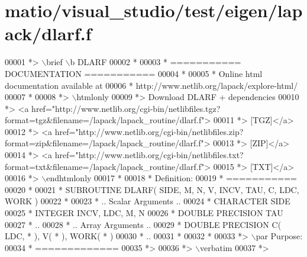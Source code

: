 \hypertarget{matio_2visual__studio_2test_2eigen_2lapack_2dlarf_8f_source}{}\section{matio/visual\+\_\+studio/test/eigen/lapack/dlarf.f}
\label{matio_2visual__studio_2test_2eigen_2lapack_2dlarf_8f_source}

\begin{DoxyCode}
00001 \textcolor{comment}{*> \(\backslash\)brief \(\backslash\)b DLARF}
00002 \textcolor{comment}{*}
00003 \textcolor{comment}{*  =========== DOCUMENTATION ===========}
00004 \textcolor{comment}{*}
00005 \textcolor{comment}{* Online html documentation available at }
00006 \textcolor{comment}{*            http://www.netlib.org/lapack/explore-html/ }
00007 \textcolor{comment}{*}
00008 \textcolor{comment}{*> \(\backslash\)htmlonly}
00009 \textcolor{comment}{*> Download DLARF + dependencies }
00010 \textcolor{comment}{*> <a
       href="http://www.netlib.org/cgi-bin/netlibfiles.tgz?format=tgz&filename=/lapack/lapack\_routine/dlarf.f"> }
00011 \textcolor{comment}{*> [TGZ]</a> }
00012 \textcolor{comment}{*> <a
       href="http://www.netlib.org/cgi-bin/netlibfiles.zip?format=zip&filename=/lapack/lapack\_routine/dlarf.f"> }
00013 \textcolor{comment}{*> [ZIP]</a> }
00014 \textcolor{comment}{*> <a
       href="http://www.netlib.org/cgi-bin/netlibfiles.txt?format=txt&filename=/lapack/lapack\_routine/dlarf.f"> }
00015 \textcolor{comment}{*> [TXT]</a>}
00016 \textcolor{comment}{*> \(\backslash\)endhtmlonly }
00017 \textcolor{comment}{*}
00018 \textcolor{comment}{*  Definition:}
00019 \textcolor{comment}{*  ===========}
00020 \textcolor{comment}{*}
00021 \textcolor{comment}{*       SUBROUTINE DLARF( SIDE, M, N, V, INCV, TAU, C, LDC, WORK )}
00022 \textcolor{comment}{* }
00023 \textcolor{comment}{*       .. Scalar Arguments ..}
00024 \textcolor{comment}{*       CHARACTER          SIDE}
00025 \textcolor{comment}{*       INTEGER            INCV, LDC, M, N}
00026 \textcolor{comment}{*       DOUBLE PRECISION   TAU}
00027 \textcolor{comment}{*       ..}
00028 \textcolor{comment}{*       .. Array Arguments ..}
00029 \textcolor{comment}{*       DOUBLE PRECISION   C( LDC, * ), V( * ), WORK( * )}
00030 \textcolor{comment}{*       ..}
00031 \textcolor{comment}{*  }
00032 \textcolor{comment}{*}
00033 \textcolor{comment}{*> \(\backslash\)par Purpose:}
00034 \textcolor{comment}{*  =============}
00035 \textcolor{comment}{*>}
00036 \textcolor{comment}{*> \(\backslash\)verbatim}
00037 \textcolor{comment}{*>}

\end{DoxyCode}
